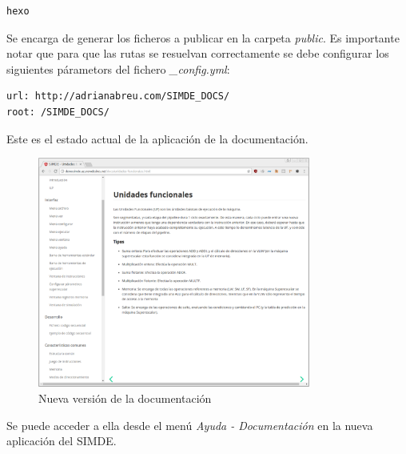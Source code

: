 \begin{lstlisting}
hexo
\end{lstlisting}

\bigskip
Se encarga de generar los ficheros a publicar en la carpeta \textit{public}. Es importante notar que para
que las rutas se resuelvan correctamente se debe configurar los siguientes párametors del fichero 
\textit{\_config.yml}:

\begin{lstlisting}
url: http://adrianabreu.com/SIMDE_DOCS/
root: /SIMDE_DOCS/
\end{lstlisting}

\bigskip
Este es el estado actual de la aplicación de la documentación.

\begin{figure}
\begin{center}
\includegraphics[width=0.8\textwidth]{images/cap5/nueva-documentacion.eps}
\caption{Nueva versión de la documentación}
\label{fig:Nueva version de la documentacion}
\end{center}
\end{figure}

\bigskip
Se puede acceder a ella desde el menú \textit{Ayuda - Documentación} en la nueva aplicación del SIMDE.